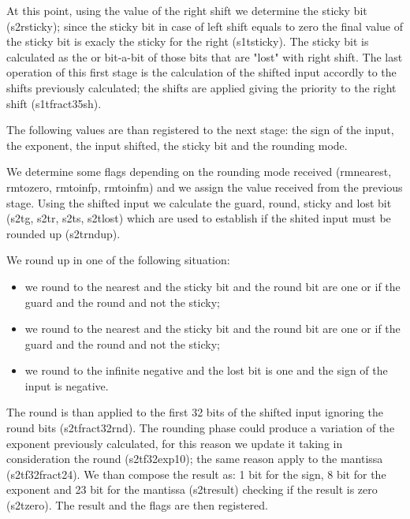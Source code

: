 At this point, using the value of the right shift we determine the sticky bit (s2r\textunderscore sticky); since the sticky bit in case of left shift equals to zero the final value of the sticky bit is exacly the sticky for the right (s1t\textunderscore sticky).
The sticky bit is calculated as the or bit-a-bit of those bits that are "lost" with right shift. 
The last operation of this first stage is the calculation of the shifted input accordly to the shifts previously calculated; the shifts are applied giving the priority to the right shift (s1t\textunderscore fract35sh).

The following values are than registered to the next stage: the sign of the input, the exponent, the input shifted, the sticky bit and the rounding mode.

We determine some flags depending on the rounding mode received (rm\textunderscore nearest, rm\textunderscore to\textunderscore zero, rm\textunderscore to\textunderscore infp, rm\textunderscore to\textunderscore infm) and we assign the value received from the previous stage.
Using the shifted input we calculate the guard, round, sticky and lost bit (s2t\textunderscore g, s2t\textunderscore r, s2t\textunderscore s, s2t\textunderscore lost) which are used to establish if the shited input must be rounded up (s2t\textunderscore rnd\textunderscore up). 

We round up in one of the following situation:
\begin{itemize}
 \item we round to the nearest and the sticky bit and the round bit are one or if the guard and the round and not the sticky;
 \item we round to the nearest and the sticky bit and the round bit are one or if the guard and the round and not the sticky;
 \item we round to the infinite negative and the lost bit is one and the sign of the input is negative.
\end{itemize}
The round is than applied to the first 32 bits of the shifted input ignoring the round bits (s2t\textunderscore fract32\textunderscore rnd).
The rounding phase could produce a variation of the exponent previously calculated, for this reason we update it taking in consideration the round (s2t\textunderscore f32\textunderscore exp10); the same reason apply to the mantissa (s2t\textunderscore f32\textunderscore fract24).
We than compose the result as: 1 bit for the sign, 8 bit for the exponent and 23 bit for the mantissa (s2t\textunderscore result) checking if the result is zero (s2t\textunderscore zero).
The result and the flags are then registered.
\newline

